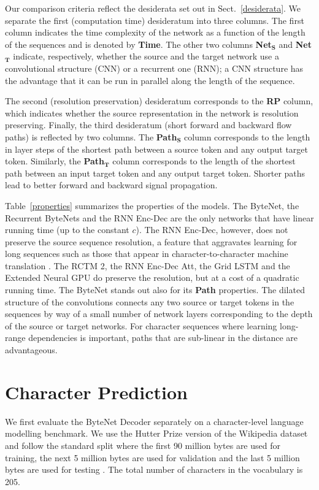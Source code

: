 Our comparison criteria reflect the desiderata set out in Sect.~\ref{desiderata}.
We separate the first (computation time) desideratum into three columns. The first column indicates the time complexity of the network as a function of the length of the sequences and is denoted by \textbf{Time}. The other two columns \textbf{Net$_\mathbf{S}$} and \textbf{Net$_\mathbf{T}$} indicate, respectively, whether the source and the target network use a convolutional structure (CNN) or a recurrent one (RNN); a CNN structure has the advantage that it can be run in parallel along the length of the sequence. 

The second (resolution preservation) desideratum corresponds to the \textbf{RP} column, which indicates whether the source representation in the network is resolution preserving. Finally, the third desideratum (short forward and backward flow paths) is reflected by two columns. The \textbf{Path$_\mathbf{S}$} column corresponds to the length in layer steps of the shortest path between a source token and any output target token. Similarly, the \textbf{Path$_\mathbf{T}$} column corresponds to the length of the shortest path between an input target token and any output target token. Shorter paths lead to better forward and backward signal propagation.

Table~\ref{properties} summarizes the properties of the models. The ByteNet, the Recurrent ByteNets and the RNN Enc-Dec are the only networks that have linear running time (up to the constant $c$). The RNN Enc-Dec, however, does not preserve the source sequence resolution, a feature that aggravates learning for long sequences such as those that appear in character-to-character machine translation  \citep{DBLP:conf/acl/LuongM16}. The RCTM 2, the RNN Enc-Dec Att, the Grid LSTM and the Extended Neural GPU do preserve the resolution, but at a cost of a quadratic running time. The ByteNet stands out also for its \textbf{Path} properties. The dilated structure of the convolutions connects any two source or target tokens in the sequences by way of a small number of network layers corresponding to the depth of the source or target networks. For character sequences where learning long-range dependencies is important, paths that are sub-linear in the distance are advantageous. 

\section{Character Prediction}

We first evaluate the ByteNet Decoder separately on a character-level language modelling benchmark. We use the Hutter Prize version of the Wikipedia dataset and follow the standard split where the first 90 million bytes are used for training, the next 5 million bytes are used for validation and the last 5 million bytes are used for testing \citep{chung2015gated}. The total number of characters in the vocabulary is 205. 

